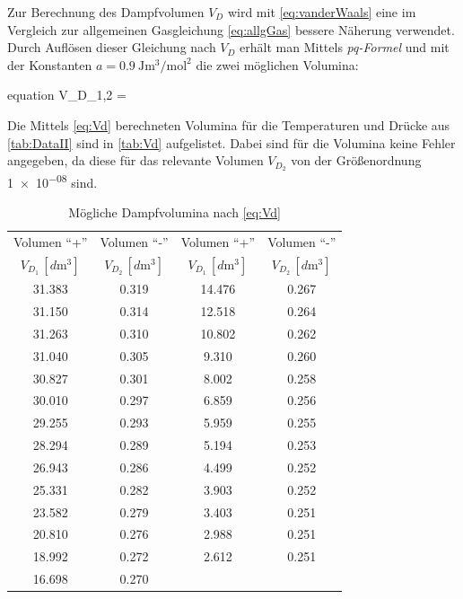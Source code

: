 	Zur Berechnung des Dampfvolumen $V_{D}$ wird mit \eqref{eq:vanderWaals} eine im Vergleich zur allgemeinen Gasgleichung
	\eqref{eq:allgGas} bessere Näherung verwendet. Durch Auflösen dieser Gleichung nach $V_{D}$ erhält man Mittels \emph{pq-Formel} 
	und mit der Konstanten 
	$ a = \SI{0.9}{\joule\cubic\meter\per\mole\squared}$ \cite{V203} 
	die zwei möglichen Volumina:
	\begin{empheq}{equation}
		V_{D_{1,2}} =  \pm {}
		\label{eq:Vd}
	\end{empheq} 
	Die Mittels \eqref{eq:Vd} berechneten Volumina für die Temperaturen und Drücke aus \autoref{tab:DataII} sind in \autoref{tab:Vd}
	aufgelistet. Dabei sind für die Volumina keine Fehler angegeben, da diese für das relevante Volumen $V_{D_{2}}$ von der Größenordnung
	\num{1e-08} sind.
	
	\begin{table}[!h]
		\centering
		\begin{tabular}{|c|c||c|c|}
			\hline
			Volumen \enquote{+} & Volumen \enquote{-} & Volumen \enquote{+} & Volumen \enquote{-}\\
			$V_{D_{1}}\,[\si{d\meter\cubed}]$  & $V_{D_{2}}\,[\si{d\meter\cubed}]$ & $V_{D_{1}}\,[\si{d\meter\cubed}]$  & $V_{D_{2}}\,[\si{d\meter\cubed}]$ \\ \hline\hline
			\num{31.383}  & \num{0.319} & \num{14.476}  & \num{0.267} \\
			\num{31.150}  & \num{0.314} &\num{12.518}  & \num{0.264} \\
			\num{31.263}  & \num{0.310} &\num{10.802}  & \num{0.262} \\
			\num{31.040}  & \num{0.305} &\num{9.310}  & \num{0.260} \\
			\num{30.827}  & \num{0.301} &\num{8.002}  & \num{0.258} \\
			\num{30.010}  & \num{0.297} &\num{6.859}  & \num{0.256} \\
			\num{29.255}  & \num{0.293} &\num{5.959}  & \num{0.255} \\
			\num{28.294}  & \num{0.289} &\num{5.194}  & \num{0.253} \\
			\num{26.943}  & \num{0.286} &\num{4.499}  & \num{0.252} \\
			\num{25.331}  & \num{0.282} &\num{3.903}  & \num{0.252} \\
			\num{23.582}  & \num{0.279} &\num{3.403}  & \num{0.251} \\
			\num{20.810}  & \num{0.276} &\num{2.988}  & \num{0.251} \\
			\num{18.992}  & \num{0.272} &\num{2.612}  & \num{0.251} \\
			\num{16.698}  & \num{0.270} & & \\
			\hline
		\end{tabular}
		\caption{Mögliche Dampfvolumina nach \eqref{eq:Vd} \label{tab:Vd}}
	\end{table}
	
